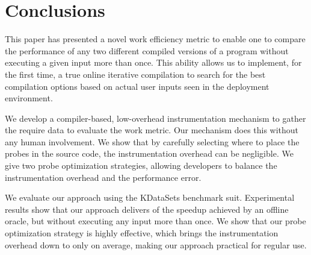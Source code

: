 \section{Conclusions}
This paper has presented a novel work efficiency metric to enable one to compare the performance of any two different compiled versions of
a program without executing a given input more than once. This ability allows us to implement, for the first time, a true online iterative
compilation  to search for the best compilation options  based on actual user inputs seen in the deployment environment.

We develop a compiler-based, low-overhead instrumentation mechanism to gather the require data to evaluate the work metric. Our mechanism
does this without any human involvement. We show that by carefully selecting where to place the probes in the source code, the
instrumentation overhead can be negligible. We give two probe optimization strategies, allowing developers to balance the instrumentation
overhead and the performance error.


We  evaluate our approach using the KDataSets benchmark suit. Experimental results show that our approach delivers  of the
speedup achieved by an offline  oracle, but without executing any input more than once. We show that our probe optimization strategy is
highly effective, which brings the instrumentation overhead down to only  on average, making our approach practical for regular
use.

